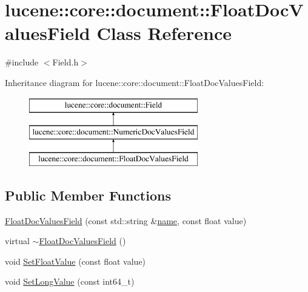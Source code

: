 \hypertarget{classlucene_1_1core_1_1document_1_1FloatDocValuesField}{}\section{lucene\+:\+:core\+:\+:document\+:\+:Float\+Doc\+Values\+Field Class Reference}
\label{classlucene_1_1core_1_1document_1_1FloatDocValuesField}


{\ttfamily \#include $<$Field.\+h$>$}

Inheritance diagram for lucene\+:\+:core\+:\+:document\+:\+:Float\+Doc\+Values\+Field\+:\begin{figure}[H]
\begin{center}
\leavevmode
\includegraphics[height=3.000000cm]{classlucene_1_1core_1_1document_1_1FloatDocValuesField}
\end{center}
\end{figure}
\subsection*{Public Member Functions}
\begin{DoxyCompactItemize}
\item 
\mbox{\hyperlink{classlucene_1_1core_1_1document_1_1FloatDocValuesField_a28e0d07c18f49ce7b7b77bcc803ab60b}{Float\+Doc\+Values\+Field}} (const std\+::string \&\mbox{\hyperlink{classlucene_1_1core_1_1document_1_1Field_a52f673f3b3abb14b180f5159f4726537}{name}}, const float value)
\item 
virtual \mbox{\hyperlink{classlucene_1_1core_1_1document_1_1FloatDocValuesField_a5b783d4241b971134aa15a69d39d5e39}{$\sim$\+Float\+Doc\+Values\+Field}} ()
\item 
void \mbox{\hyperlink{classlucene_1_1core_1_1document_1_1FloatDocValuesField_a929d0812b571be2208f51d420b0dd9ed}{Set\+Float\+Value}} (const float value)
\item 
void \mbox{\hyperlink{classlucene_1_1core_1_1document_1_1FloatDocValuesField_a27b6b009471cbaa1b0baf8facb97fa6d}{Set\+Long\+Value}} (const int64\+\_\+t)
\end{DoxyCompactItemize}
